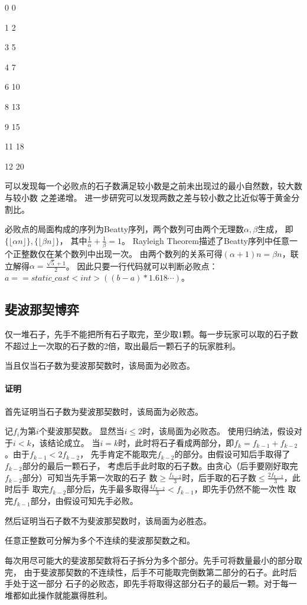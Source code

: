 0 0

1 2

3 5

4 7

6 10

8 13

9 15

11 18

12 20

可以发现每一个必败点的石子数满足较小数是之前未出现过的最小自然数，较大数与较小数
之差递增。
进一步研究可以发现两数之差与较小数之比近似等于黄金分割比。

必败点的局面构成的序列为Beatty序列，两个数列可由两个无理数$\alpha,\beta$生成，
即$\{\lfloor\alpha n\rfloor\},\{\lfloor\beta n\rfloor\}$，
其中$\frac{1}{\alpha}+\frac{1}{\beta}=1$。
Rayleigh Theorem描述了Beatty序列中任意一个正整数仅在某个数列中出现一次。
由两个数列的关系可得$(\alpha+1)n=\beta n$，联立解得$\alpha=\frac{\sqrt{5}+1}{2}$。
因此只要一行代码就可以判断必败点：$a==static\_cast<int>((b-a)*1.618\cdots)$。

\subsection{斐波那契博弈}
仅一堆石子，先手不能把所有石子取完，至少取1颗。每一步玩家可以取的石子数
不超过上一次取的石子数的2倍，取出最后一颗石子的玩家胜利。

\begin{theorem}
	当且仅当石子数为斐波那契数时，该局面为必败态。
\end{theorem}

\paragraph{证明}
首先证明当石子数为斐波那契数时，该局面为必败态。

记$f_i$为第$i$个斐波那契数。
显然当$i\leq 2$时，该局面为必败态。
使用归纳法，假设对于$i<k$，该结论成立。
当$i=k$时，此时将石子看成两部分，即$f_k=f_{k-1}+f_{k-2}$。由于$f_{k-1}<2f_{k-2}$，
先手肯定不能取完$f_{k-2}$的部分。由假设可知后手取得了$f_{k-2}$部分的最后一颗石子，
考虑后手此时取的石子数。由贪心（后手要刚好取完$f_{k-2}$部分）可知当先手第一次取的石子
数$\geq \frac{f_{k-2}}{3}$时，后手取的石子数$\leq \frac{2f_{k-2}}{3}$，此时后手
取完$f_{k-2}$部分后，先手最多取得$\frac{4f_{k-2}}{3}<f_{k-1}$，即先手仍然不能一次性
取完$f_{k-1}$部分，由假设可知先手必败。

然后证明当石子数不为斐波那契数时，该局面为必胜态。
\begin{lemma}
	任意正整数可分解为多个不连续的斐波那契数之和。
\end{lemma}
每次用尽可能大的斐波那契数将石子拆分为多个部分。先手可将数量最小的部分取完，
由于斐波那契数的不连续性，后手不可能取完倒数第二部分的石子。此时后手处于这一部分
石子的必败态，即先手将取得这部分石子的最后一颗。对于每一堆都如此操作就能赢得胜利。

